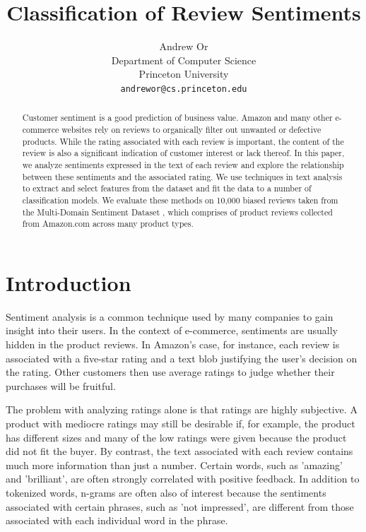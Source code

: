\documentclass{article} %
\title{Classification of Review Sentiments}
\author{
Andrew Or\\
Department of Computer Science\\
Princeton University\\
\texttt{andrewor@cs.princeton.edu} \\
}
\begin{document}
\maketitle

\begin{abstract}

Customer sentiment is a good prediction of business value. Amazon and many other e-commerce websites rely on reviews to organically filter out unwanted or defective products. While the rating associated with each review is important, the content of the review is also a significant indication of customer interest or lack thereof. In this paper, we analyze sentiments expressed in the text of each review and explore the relationship between these sentiments and the associated rating. We use techniques in text analysis to extract and select features from the dataset and fit the data to a number of classification models. We evaluate these methods on 10,000 biased reviews taken from the Multi-Domain Sentiment Dataset \cite{largedataset}, which comprises of product reviews collected from Amazon.com across many product types.

\end{abstract}
\section{Introduction}

Sentiment analysis is a common technique used by many companies to gain insight into their users. In the context of e-commerce, sentiments are usually hidden in the product reviews. In Amazon's case, for instance, each review is associated with a five-star rating and a text blob justifying the user's decision on the rating. Other customers then use average ratings to judge whether their purchases will be fruitful.

The problem with analyzing ratings alone is that ratings are highly subjective. A product with mediocre ratings may still be desirable if, for example, the product has different sizes and many of the low ratings were given because the product did not fit the buyer. By contrast, the text associated with each review contains much more information than just a number. Certain words, such as 'amazing' and 'brilliant', are often strongly correlated with positive feedback. In addition to tokenized words, n-grams are often also of interest because the sentiments associated with certain phrases, such as 'not impressed', are different from those associated with each individual word in the phrase.
\end{document}
